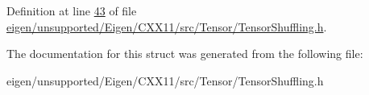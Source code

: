 Definition at line \hyperlink{eigen_2unsupported_2_eigen_2_c_x_x11_2src_2_tensor_2_tensor_shuffling_8h_source_l00043}{43} of file \hyperlink{eigen_2unsupported_2_eigen_2_c_x_x11_2src_2_tensor_2_tensor_shuffling_8h_source}{eigen/unsupported/\+Eigen/\+C\+X\+X11/src/\+Tensor/\+Tensor\+Shuffling.\+h}.



The documentation for this struct was generated from the following file\+:\begin{DoxyCompactItemize}
\item 
eigen/unsupported/\+Eigen/\+C\+X\+X11/src/\+Tensor/\+Tensor\+Shuffling.\+h\end{DoxyCompactItemize}
